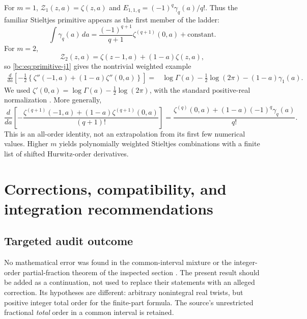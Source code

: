 \documentclass[11pt,letterpaper]{article}
\numberwithin{equation}{section}
\theoremstyle{definition}
\theoremstyle{remark}
\newcommand{\bcZ}{\mathcal Z}
\begin{document}
For $m=1$, $\bcZ_1(z,a)=\zeta(z,a)$ and
$E_{1,1,q}=(-1)^q\gamma_q(a)/q!$. Thus the familiar Stieltjes primitive
appears as the first member of the ladder:
\begin{equation}\label{bc:eq:classical-Stieltjes-primitive}
 \int\gamma_q(a)\,da=
       \frac{(-1)^{q+1}}{q+1}\zeta^{(q+1)}(0,a)+\text{constant}.
\end{equation}
For $m=2$,
\begin{equation}\label{bc:eq:Z2}
 \bcZ_2(z,a)=\zeta(z-1,a)+(1-a)\zeta(z,a),
\end{equation}
so \eqref{bc:eq:primitive-j1} gives the nontrivial weighted example
\begin{align}
 \frac{d}{da}\left[-\frac12\left\{
             \zeta''(-1,a)+(1-a)\zeta''(0,a)\right\}\right]
   ={}&\log\Gamma(a)-\frac12\log(2\pi)
                           -(1-a)\gamma_1(a).
 \label{bc:eq:weighted-Stieltjes-primitive}
\end{align}
We used $\zeta'(0,a)=\log\Gamma(a)-\tfrac12\log(2\pi)$, with the
standard positive-real normalization \cite{dlmf-hurwitz}. More generally,
\begin{equation}\label{bc:eq:weighted-general-q}
 \frac{d}{da}\left[-\frac{
       \zeta^{(q+1)}(-1,a)+(1-a)\zeta^{(q+1)}(0,a)}{(q+1)!}\right]
 =\frac{\zeta^{(q)}(0,a)+(1-a)(-1)^q\gamma_q(a)}{q!}.
\end{equation}
This is an all-order identity, not an extrapolation from its first
few numerical values. Higher $m$ yields polynomially weighted
Stieltjes combinations with a finite list of shifted Hurwitz-order
derivatives.

\section{Corrections, compatibility, and integration recommendations}
\label{bc:sec:audit}

\subsection{Targeted audit outcome}

No mathematical error was found in the common-interval mixture or the
integer-order partial-fraction theorem of the inspected section
\cite{repo-mixed}. The present result should be added as a continuation,
not used to replace their statements with an alleged correction. Its
hypotheses are different: arbitrary nonintegral real twists, but positive
integer total order for the finite-part formula. The source's unrestricted
fractional \emph{total} order in a common interval is retained.
\end{document}
